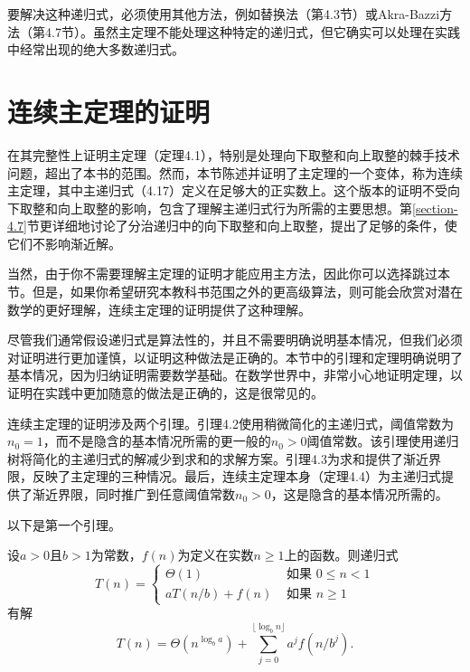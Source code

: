 \documentclass[lang=cn,newtx,10pt,scheme=chinese]{elegantbook}
\begin{document}
要解决这种递归式，必须使用其他方法，例如替换法（第4.3节）或Akra-Bazzi方法（第4.7节）。虽然主定理不能处理这种特定的递归式，但它确实可以处理在实践中经常出现的绝大多数递归式。

\section{连续主定理的证明}\label{section-4.6}

在其完整性上证明主定理（定理4.1），特别是处理向下取整和向上取整的棘手技术问题，超出了本书的范围。然而，本节陈述并证明了主定理的一个变体，称为连续主定理，其中主递归式（4.17）定义在足够大的正实数上。这个版本的证明不受向下取整和向上取整的影响，包含了理解主递归式行为所需的主要思想。第\ref{section-4.7}节更详细地讨论了分治递归中的向下取整和向上取整，提出了足够的条件，使它们不影响渐近解。

当然，由于你不需要理解主定理的证明才能应用主方法，因此你可以选择跳过本节。但是，如果你希望研究本教科书范围之外的更高级算法，则可能会欣赏对潜在数学的更好理解，连续主定理的证明提供了这种理解。

尽管我们通常假设递归式是算法性的，并且不需要明确说明基本情况，但我们必须对证明进行更加谨慎，以证明这种做法是正确的。本节中的引理和定理明确说明了基本情况，因为归纳证明需要数学基础。在数学世界中，非常小心地证明定理，以证明在实践中更加随意的做法是正确的，这是很常见的。

连续主定理的证明涉及两个引理。引理4.2使用稍微简化的主递归式，阈值常数为$n_0=1$，而不是隐含的基本情况所需的更一般的$n_0>0$阈值常数。该引理使用递归树将简化的主递归式的解减少到求和的求解方案。引理4.3为求和提供了渐近界限，反映了主定理的三种情况。最后，连续主定理本身（定理4.4）为主递归式提供了渐近界限，同时推广到任意阈值常数$n_0>0$，这是隐含的基本情况所需的。

以下是第一个引理。

\begin{lemma}{}{}
设$a>0$且$b>1$为常数，$f(n)$为定义在实数$n \geq 1$上的函数。则递归式
$$
T(n)= \begin{cases}\Theta(1) & \text { 如果 } 0 \leq n<1 \\ a T(n / b)+f(n) & \text { 如果 } n \geq 1\end{cases}
$$
有解
$$
T(n)=\Theta(n^{\log _b a})+\sum_{j=0}^{\lfloor\log _b n\rfloor} a^j f(n/b^j) .
$$
\end{lemma}
\end{document}
